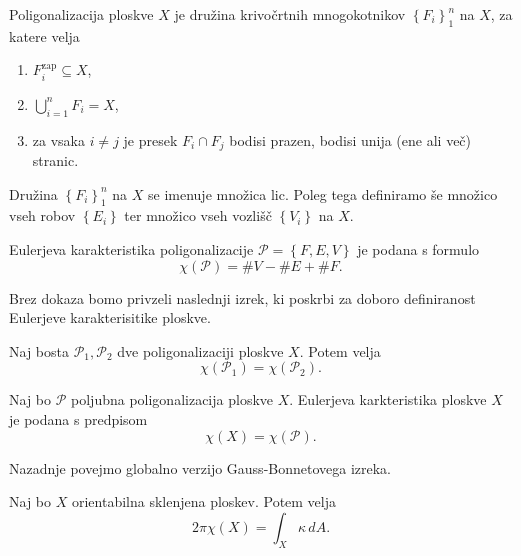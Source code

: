 \begin{definicija}
\label{def_poligonalizacija_ploskve}
Poligonalizacija ploskve $X$ je družina krivočrtnih mnogokotnikov $\left\{ F_i\right\}_1^{n}$ na $X$, za katere velja \begin{enumerate}
    \item  $F_i^{\text{zap}} \subseteq  X$, 
    \item $\bigcup_{i = 1}^{n} F_i = X$,
    \item za vsaka $i \neq j$ je presek $F_i \cap  F_j$ bodisi prazen, bodisi unija (ene ali več) stranic. 
\end{enumerate}
Družina $\left\{ F_i\right\}_1^{n}$ na $X$ se imenuje množica lic. Poleg tega definiramo še množico vseh robov $\left\{ E_i\right\}$ ter množico vseh vozlišč $\left\{ V_i\right\}$ na $X$.
\end{definicija}

\begin{definicija}
\label{def_Eulerjeva_karakteristika}
Eulerjeva karakteristika poligonalizacije $\mathcal{P} = \left\{ F, E, V\right\}$ je podana s formulo \begin{equation*}
\chi(\mathcal{P}) =  \#V -  \#E + \#F.
\end{equation*}  
\end{definicija}

Brez dokaza bomo privzeli naslednji izrek, ki poskrbi za doboro definiranost Eulerjeve karakterisitike ploskve.
\begin{izrek}
\label{izr_dobra_definiranost_Eulerjeve_karkteristike}
 Naj bosta $\mathcal{P}_1, \mathcal{P}_2$ dve poligonalizaciji ploskve $X$. Potem velja \begin{equation*}
 \chi(\mathcal{P}_1) = \chi(\mathcal{P}_2).
\end{equation*}  
\end{izrek}

\begin{definicija}
\label{def_Eulerjeva_karkteristika}
Naj bo $\mathcal{P}$ poljubna poligonalizacija ploskve $X$. Eulerjeva karkteristika ploskve $X$ je podana s predpisom \begin{equation*}
\chi(X) = \chi(\mathcal{P}).
\end{equation*}  
   
\end{definicija}

Nazadnje povejmo globalno verzijo Gauss-Bonnetovega izreka.

\begin{izrek}
\label{izr_globalni_GB}
Naj bo $X$ orientabilna sklenjena ploskev. Potem velja \begin{equation*}
2 \pi \chi(X) = \int_{X} \kappa \, dA.
\end{equation*}  
\end{izrek}

